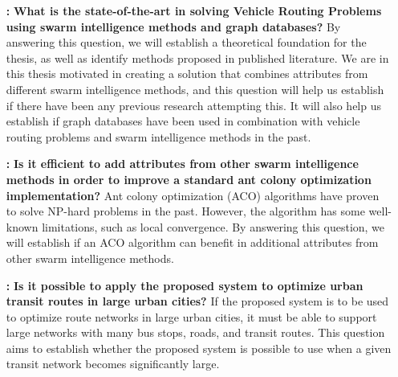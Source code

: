 \begin{itemize}

    \item[\textbf{\namedlabel{itm:RQ1}{RQ 1}:}] \textbf{What is the state-of-the-art in solving Vehicle Routing Problems using swarm intelligence methods and graph databases?}
    \newline
    By answering this question, we will establish a theoretical foundation for the thesis, as well as identify methods proposed in published literature. We are in this thesis motivated in creating a solution that combines attributes from different swarm intelligence methods, and this question will help us establish if there have been any previous research attempting this. It will also help us establish if graph databases have been used in combination with vehicle routing problems and swarm intelligence methods in the past. 


    \item[\textbf{\namedlabel{itm:RQ2}{RQ 2}:}]\label{itm:RQ2} \textbf{Is it efficient to add attributes from other swarm intelligence methods in order to improve a standard ant colony optimization implementation?}
    \newline
    Ant colony optimization (ACO) algorithms have proven to solve NP-hard problems in the past. However, the algorithm has some well-known limitations, such as local convergence. By answering this question, we will establish if an ACO algorithm can benefit in additional attributes from other swarm intelligence methods. 

    \item[\textbf{\namedlabel{itm:RQ3}{RQ 3}:}]\label{itm:RQ3}\textbf{Is it possible to apply the proposed system to optimize urban transit routes in large urban cities?}
    \newline
    If the proposed system is to be used to optimize route networks in large urban cities, it must be able to support large networks with many bus stops, roads, and transit routes. This question aims to establish whether the proposed system is possible to use when a given transit network becomes significantly large. 
\end{itemize}



